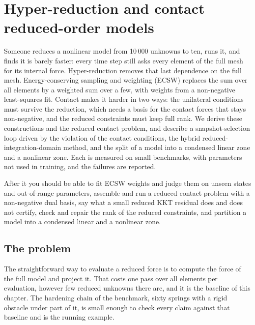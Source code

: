 \chapter{Hyper-reduction and contact reduced-order models}\label{ch:hyper}

\begin{tcolorbox}[colback=hpale,colframe=hnavy!60,coltitle=white,colbacktitle=hnavy!85,title={In this chapter}]
Someone reduces a nonlinear model from 10\,000 unknowns to ten, runs it, and finds it is barely faster: every time step still asks every element of the full mesh for its internal force. Hyper-reduction removes that last dependence on the full mesh. Energy-conserving sampling and weighting (ECSW) replaces the sum over all elements by a weighted sum over a few, with weights from a non-negative least-squares fit. Contact makes it harder in two ways: the unilateral conditions must survive the reduction, which needs a basis for the contact forces that stays non-negative, and the reduced constraints must keep full rank. We derive these constructions and the reduced contact problem, and describe a snapshot-selection loop driven by the violation of the contact conditions, the hybrid reduced-integration-domain method, and the split of a model into a condensed linear zone and a nonlinear zone. Each is measured on small benchmarks, with parameters not used in training, and the failures are reported.\par\smallskip
After it you should be able to fit ECSW weights and judge them on unseen states and out-of-range parameters, assemble and run a reduced contact problem with a non-negative dual basis, say what a small reduced KKT residual does and does not certify, check and repair the rank of the reduced constraints, and partition a model into a condensed linear and a nonlinear zone.
\end{tcolorbox}

\section{The problem}\label{sec:hy-problem}

The straightforward way to evaluate a reduced force is to compute the force of the full model and project it. That costs one pass over all elements per evaluation, however few reduced unknowns there are, and it is the baseline of this chapter. The hardening chain of the benchmark, sixty springs with a rigid obstacle under part of it, is small enough to check every claim against that baseline and is the running example.

